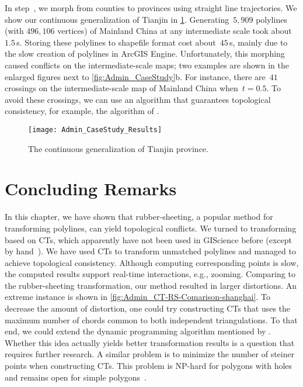 In step~, we morph from counties to provinces 
using straight line trajectories. 
We show our continuous generalization of Tianjin in 
\fig\ref{fig:Admin_CaseStudy_Tianjin}.
Generating~$5{,}909$ polylines (with $496{,}106$ vertices) of 
Mainland China at any intermediate scale took about~$1.5\,$s.
Storing these polylines to shapefile format cost about~$45\,$s,
mainly due to the slow creation of polylines in ArcGIS Engine.
Unfortunately, this morphing caused conflicts on the 
intermediate-scale maps; 
two examples are shown in the enlarged figures next to
\fig\ref{fig:Admin_CaseStudy}b. 
For instance, there are~$41$ crossings on the 
intermediate-scale map of Mainland China when~$t=0.5$. 
To avoid these crossings, we can use an algorithm 
that guarantees topological consistency, 
for example, the algorithm of \textcite{GotsmanS2001}.

\begin{figure}[tb]
	\centering
	\texttt{[image: Admin\_CaseStudy\_Results]}
	\caption{The continuous generalization of Tianjin province.}
	\label{fig:Admin_CaseStudy_Tianjin}
\end{figure}


\section{Concluding Remarks}
\label{sec:Admin_Conclusions}

In this chapter, we have shown that rubber-sheeting, 
a popular method for transforming polylines, 
can yield topological conflicts.
We turned to transforming based on CTs,
which apparently have not been used 
in GIScience before (except by hand~\parencite{Fuse2004}).
We have used CTs to 
transform unmatched polylines and 
managed to achieve topological consistency. 
Although computing corresponding points is slow, 
the computed results support 
real-time interactions, e.g., zooming.
Comparing to the rubber-sheeting transformation, 
our method resulted in larger distortions.  
An extreme instance is shown in
\fig\ref{fig:Admin_CT-RS-Comarison-shanghai}.
To decrease the amount of distortion, 
one could try constructing CTs 
that uses the maximum number of chords common to 
both independent triangulations.
To that end, we could extend the dynamic programming algorithm
mentioned by \textcite{Diwan2011Triangulations}.
Whether this idea actually yields better transformation results 
is a question that requires further research.
A similar problem is to minimize the number of steiner points 
when constructing CTs.
This problem is NP-hard for polygons with holes and 
remains open for simple polygons~\parencite{Lubiw2017CT}.


